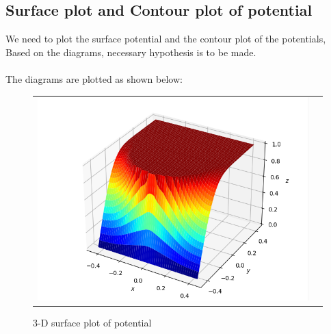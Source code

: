\documentclass[11pt, a4paper]{article}
\begin{document}
        \subsection{Surface plot and Contour plot of potential}
        
        We need to plot the surface potential and the contour plot of the potentials, Based on the diagrams, necessary hypothesis is to be made.\\
        \\The diagrams are plotted as shown below:   
                 \begin{figure}[H]
                    \centering
                    \setlength\tabcolsep{2pt}
                    \begin{tabular}{cc}
                       \includegraphics[scale=0.9]{Fig5.png}
                    \end{tabular}
                    \caption{3-D surface  plot of potential} 
                \end{figure}
 		
\end{document}
